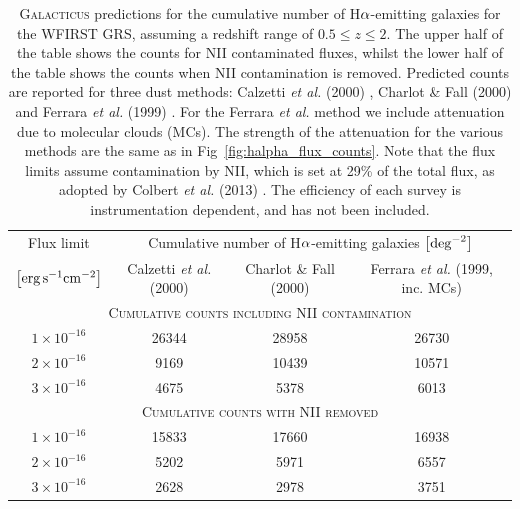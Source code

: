 \begin{table}
\centering
\caption{\textsc{Galacticus} predictions for the cumulative number of
  H${\rm \alpha}$-emitting galaxies for the WFIRST GRS, assuming a
  redshift range of $0.5\leqslant z\leqslant 2$. The upper half of the
  table shows the counts for NII contaminated fluxes, whilst the lower
  half of the table shows the counts when NII contamination is
  removed. Predicted counts are reported for three dust methods:
  Calzetti \textit{et al.} (2000) \protect\cite{Calzetti00}, Charlot
  \& Fall (2000) \protect\cite{Charlot00} and Ferrara \textit{et al.}
  (1999) \protect\cite{Ferrara99}. For the Ferrara \textit{et al.}
  method we include attenuation due to molecular clouds (MCs). The
  strength of the attenuation for the various methods are the same as
  in Fig~\ref{fig:halpha_flux_counts}. Note that the flux limits
  assume contamination by NII, which is set at 29\% of the
  total flux, as adopted by Colbert \textit{et al.} (2013)
  \protect\cite{Colbert13}. The efficiency of each survey is
  instrumentation dependent, and has not been included.}
\begin{tabular}{|c|c|c|c|}
\hline
Flux limit&\multicolumn{3}{|c|}{Cumulative number of
  H${\rm \alpha}$-emitting galaxies $\left [{\rm deg}^{-2}\right ]$}\\
$\left [{\rm erg}\,{\rm s}^{-1}{\rm cm}^{-2}\right ]$&Calzetti \textit{et al.} (2000)&Charlot \& Fall (2000)&Ferrara \textit{et al.} (1999, inc. MCs)\\
\hline\hline
\multicolumn{4}{|c|}{\textsc{Cumulative counts including NII contamination}}\\
\hline
$1\times 10^{-16}$&26344&28958&26730\\
$2\times 10^{-16}$&9169&10439&10571\\
$3\times 10^{-16}$&4675&5378&6013\\
\hline
\multicolumn{4}{|c|}{\textsc{Cumulative counts with NII removed}}\\
\hline
$1\times 10^{-16}$&15833&17660&16938\\
$2\times 10^{-16}$&5202&5971&6557\\
$3\times 10^{-16}$&2628&2978&3751\\
\hline
\end{tabular}
\label{tab:cumulativeFluxCounts}
\end{table}

